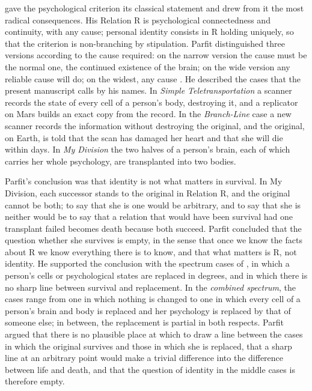 \documentclass{situationist-preprint}
\begin{document}
\citet{Parfit1971,Parfit1984} gave the psychological criterion its classical statement and drew from it the most radical consequences. His Relation R is psychological connectedness and continuity, with any cause; personal identity consists in R holding uniquely, so that the criterion is non-branching by stipulation. Parfit distinguished three versions according to the cause required: on the narrow version the cause must be the normal one, the continued existence of the brain; on the wide version any reliable cause will do; on the widest, any cause \citep[ch.~10]{Parfit1984}. He described the cases that the present manuscript calls by his names. In \emph{Simple Teletransportation} a scanner records the state of every cell of a person's body, destroying it, and a replicator on Mars builds an exact copy from the record. In the \emph{Branch-Line} case a new scanner records the information without destroying the original, and the original, on Earth, is told that the scan has damaged her heart and that she will die within days. In \emph{My Division} the two halves of a person's brain, each of which carries her whole psychology, are transplanted into two bodies.

Parfit's conclusion was that identity is not what matters in survival. In My Division, each successor stands to the original in Relation R, and the original cannot be both; to say that she is one would be arbitrary, and to say that she is neither would be to say that a relation that would have been survival had one transplant failed becomes death because both succeed. Parfit concluded that the question whether she survives is empty, in the sense that once we know the facts about R we know everything there is to know, and that what matters is R, not identity. He supported the conclusion with the spectrum cases of \citep[ch.~11]{Parfit1984}, in which a person's cells or psychological states are replaced in degrees, and in which there is no sharp line between survival and replacement. In the \emph{combined spectrum}, the cases range from one in which nothing is changed to one in which every cell of a person's brain and body is replaced and her psychology is replaced by that of someone else; in between, the replacement is partial in both respects. Parfit argued that there is no plausible place at which to draw a line between the cases in which the original survives and those in which she is replaced, that a sharp line at an arbitrary point would make a trivial difference into the difference between life and death, and that the question of identity in the middle cases is therefore empty.
\end{document}
